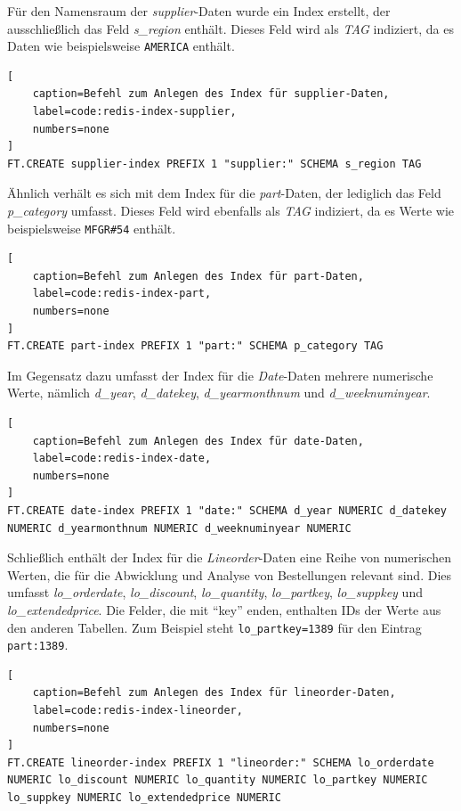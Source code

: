Für den Namensraum der \emph{supplier}-Daten wurde ein Index erstellt, der ausschließlich das Feld \emph{s\_region} enthält. Dieses Feld wird als \emph{TAG} indiziert, da es Daten wie beispielsweise \lstinline|AMERICA| enthält. %

\begin{lstlisting}[
    caption=Befehl zum Anlegen des Index für supplier-Daten,
    label=code:redis-index-supplier,
    numbers=none
]
FT.CREATE supplier-index PREFIX 1 "supplier:" SCHEMA s_region TAG
\end{lstlisting}


Ähnlich verhält es sich mit dem Index für die \emph{part}-Daten, der lediglich das Feld \emph{p\_category} umfasst. Dieses Feld wird ebenfalls als \emph{TAG} indiziert, da es Werte wie beispielsweise \lstinline|MFGR#54| enthält.

\begin{lstlisting}[
    caption=Befehl zum Anlegen des Index für part-Daten,
    label=code:redis-index-part,
    numbers=none
]
FT.CREATE part-index PREFIX 1 "part:" SCHEMA p_category TAG
\end{lstlisting}


Im Gegensatz dazu umfasst der Index für die \emph{Date}-Daten mehrere numerische Werte, nämlich \emph{d\_year}, \emph{d\_datekey}, \emph{d\_yearmonthnum} und \emph{d\_weeknuminyear}. 

\begin{lstlisting}[
    caption=Befehl zum Anlegen des Index für date-Daten,
    label=code:redis-index-date,
    numbers=none
]
FT.CREATE date-index PREFIX 1 "date:" SCHEMA d_year NUMERIC d_datekey NUMERIC d_yearmonthnum NUMERIC d_weeknuminyear NUMERIC
\end{lstlisting}


Schließlich enthält der Index für die \emph{Lineorder}-Daten eine Reihe von numerischen Werten, die für die Abwicklung und Analyse von Bestellungen relevant sind. Dies umfasst \emph{lo\_orderdate}, \emph{lo\_discount}, \emph{lo\_quantity}, \emph{lo\_partkey}, \emph{lo\_suppkey} und \emph{lo\_extendedprice}. Die Felder, die mit \enquote{key} enden, enthalten IDs der Werte aus den anderen Tabellen. Zum Beispiel steht \lstinline|lo_partkey=1389| für den Eintrag \lstinline|part:1389|.

\begin{lstlisting}[
    caption=Befehl zum Anlegen des Index für lineorder-Daten,
    label=code:redis-index-lineorder,
    numbers=none
]
FT.CREATE lineorder-index PREFIX 1 "lineorder:" SCHEMA lo_orderdate NUMERIC lo_discount NUMERIC lo_quantity NUMERIC lo_partkey NUMERIC lo_suppkey NUMERIC lo_extendedprice NUMERIC
\end{lstlisting}

